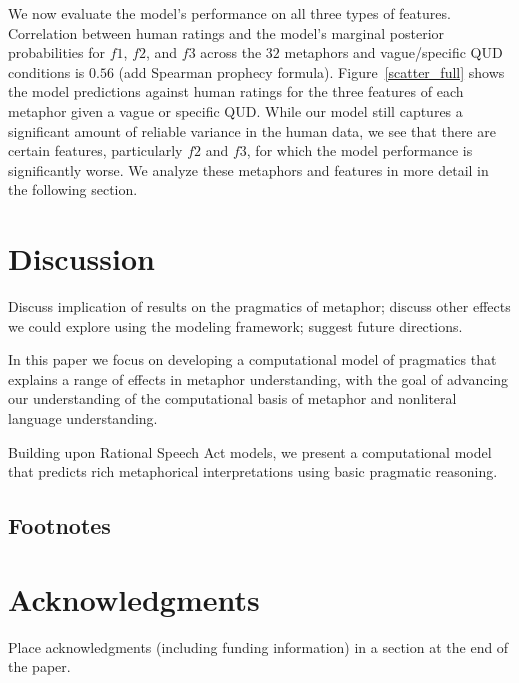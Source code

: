 \documentclass[10pt,letterpaper]{article}
\begin{document}
We now evaluate the model's performance on all three types of features. Correlation between human ratings and the model's marginal posterior probabilities for $f1$, $f2$, and $f3$ across the $32$ metaphors and vague/specific QUD conditions is $0.56$ (add Spearman prophecy formula). Figure~\ref{scatter_full} shows the model predictions against human ratings for the three features of each metaphor given a vague or specific QUD. While our model still captures a significant amount of reliable variance in the human data, we see that there are certain features, particularly $f2$ and $f3$, for which the model performance is significantly worse. We analyze these metaphors and features in more detail in the following section.






\section{Discussion}
Discuss implication of results on the pragmatics of metaphor; discuss other effects we could explore using the modeling framework; suggest future directions.

In this paper we focus on developing a computational model of pragmatics that explains a range of effects in metaphor understanding, with the goal of advancing our understanding of the computational basis of metaphor and nonliteral language understanding.

Building upon Rational Speech Act models, we present a computational model that predicts rich metaphorical interpretations using basic pragmatic reasoning.

\subsection{Footnotes}





\section{Acknowledgments}

Place acknowledgments (including funding information) in a section at
the end of the paper.





\setlength{\bibleftmargin}{.125in}
\setlength{\bibindent}{-\bibleftmargin}


\end{document}

